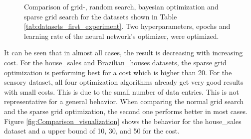 \begin{figure}[htbp!]
	\caption{ Comparison of grid-, random search, bayesian optimization and sparse grid search for the datasets shown in Table \ref{tab:datasets_first_experiment}. Two hyperparameters, epochs and learning rate of the neural network's optimizer, were optimized. }	
	\label{fig:result_first_comparison}
\end{figure}

It can be seen that in almost all cases, the result is decreasing with increasing cost. For the house\_sales and Brazilian\_houses datasets, the sparse grid optimization is performing best for a cost which is higher than 20. For the sensory dataset, all four optimization algorithms already get very good results with small costs. This is due to the small number of data entries. This is not representative for a general behavior. When comparing the normal grid search and the sparse grid optimization, the second one performs better in most cases. Figure \ref{fig:Comparison_visualization} shows the behavior for the house\_sales dataset and a upper bound of 10, 30, and 50 for the cost.

